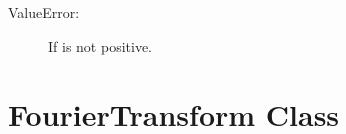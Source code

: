 \documentclass[letterpaper,10pt,english]{sphinxmanual}
\begin{document}
\begin{fulllineitems}
\begin{fulllineitems}
\begin{description}
\begin{description}
\item[{ValueError:}] \leavevmode
If  is not positive.

\end{description}

\end{description}

\end{fulllineitems}


\end{fulllineitems}



\chapter{FourierTransform Class}
\label{\detokenize{index:fouriertransform-class}}
\end{document}
